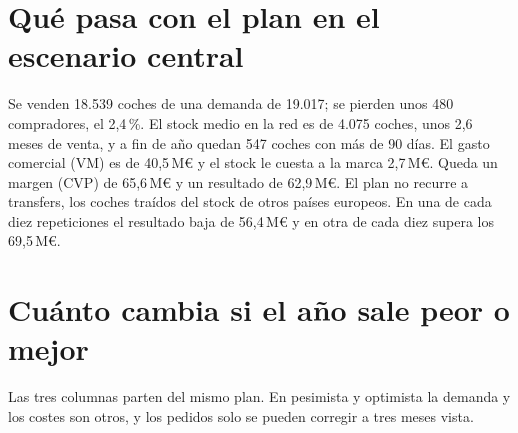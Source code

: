 \documentclass[10pt,a4paper]{article}
\newcommand{\MEE}{\,M\euro}
\begin{document}
\section{Qué pasa con el plan en el escenario central}
Se venden 18.539 coches de una demanda de 19.017; se pierden unos 480
compradores, el 2,4\,\%. El stock medio en la red es de 4.075 coches, unos
2,6 meses de venta, y a fin de año quedan 547 coches con más de 90 días.
El gasto comercial (VM) es de 40,5\MEE{} y el stock le cuesta a la marca
2,7\MEE. Queda un margen (CVP) de 65,6\MEE{} y un resultado de 62,9\MEE{}.
El plan no recurre a transfers, los coches traídos del stock de otros
países europeos. En una de cada diez repeticiones el resultado baja de 56,4\MEE{} y en
otra de cada diez supera los 69,5\MEE.

\clearpage
\section{Cuánto cambia si el año sale peor o mejor}
Las tres columnas parten del mismo plan. En pesimista y optimista la demanda y los
costes son otros, y los pedidos solo se pueden corregir a tres meses vista.
\end{document}
